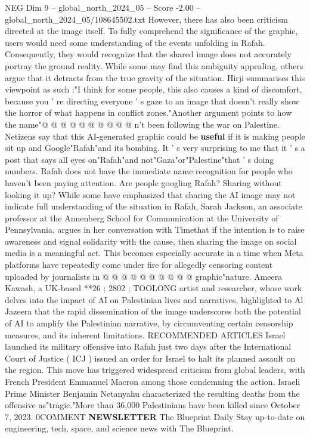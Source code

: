 \begin{textsample}{NEG Dim 9 – global\_north\_2024\_05 – Score -2.00 – global\_north\_2024\_05/108645502.txt}
However, there has also been criticism directed at the image itself.
To fully comprehend the significance of the graphic, users would need some understanding of the events unfolding in Rafah.
Consequently, they would recognize that the shared image does not accurately portray the ground reality.
While some may find this ambiguity appealing, others argue that it detracts from the true gravity of the situation.
Hirji summarises this viewpoint as such :"I think for some people, this also causes a kind of discomfort, because you ' re directing everyone ' s gaze to an image that doesn't really show the horror of what happens in conflict zones."Another argument points to how the name"@ @ @ @ @ @ @ @ @ @ n't been following the war on Palestine.
Netizens say that this AI-generated graphic could be \textbf{useful} if it is making people sit up and Google"Rafah"and its bombing.
It ' s very surprising to me that it ' s a post that says all eyes on"Rafah"and not"Gaza"or"Palestine"that ' s doing numbers.
Rafah does not have the immediate name recognition for people who haven't been paying attention.
Are people googling Rafah?
Sharing without looking it up?
While some have emphasized that sharing the AI image may not indicate full understanding of the situation in Rafah, Sarah Jackson, an associate professor at the Annenberg School for Communication at the University of Pennsylvania, argues in her conversation with Timethat if the intention is to raise awareness and signal solidarity with the cause, then sharing the image on social media is a meaningful act.
This becomes especially accurate in a time when Meta platforms have repeatedly come under fire for allegedly censoring content uploaded by journalists in @ @ @ @ @ @ @ @ @ @ graphic"nature.
Ameera Kawash, a UK-based **26 ; 2802 ; TOOLONG artist and researcher, whose work delves into the impact of AI on Palestinian lives and narratives, highlighted to Al Jazeera that the rapid dissemination of the image underscores both the potential of AI to amplify the Palestinian narrative, by circumventing certain censorship measures, and its inherent limitations.
RECOMMENDED ARTICLES Israel launched its military offensive into Rafah just two days after the International Court of Justice ( ICJ ) issued an order for Israel to halt its planned assault on the region.
This move has triggered widespread criticism from global leaders, with French President Emmanuel Macron among those condemning the action.
Israeli Prime Minister Benjamin Netanyahu characterized the resulting deaths from the offensive as"tragic."More than 36,000 Palestinians have been killed since October 7, 2023. 0COMMENT \textbf{NEWSLETTER} The Blueprint Daily Stay up-to-date on engineering, tech, space, and science news with The Blueprint.

\end{textsample}
